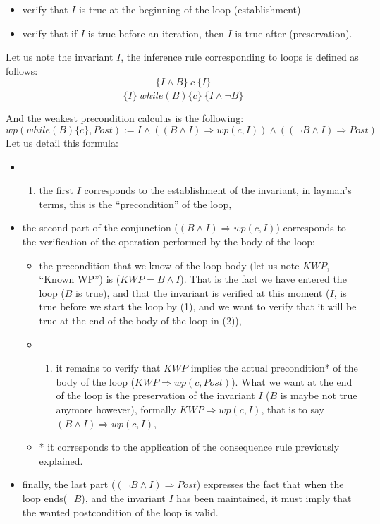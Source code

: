 \begin{itemize}
\item
  verify that $I$ is true at the beginning of the loop (establishment)
\item
  verify that if $I$ is true before an iteration, then $I$ is true
  after (preservation).
\end{itemize}


Let us note the invariant $I$, the inference rule corresponding to
loops is defined as follows:
$$\dfrac{\{I \wedge B \}\ c\ \{I\}}{\{I\}\ while(B)\{c\}\ \{I \wedge \neg B\}}$$

And the weakest precondition calculus is the following:
$$wp(while (B) \{ c \}, Post) := I \wedge ((B \wedge I) \Rightarrow wp(c, I)) \wedge ((\neg B \wedge I) \Rightarrow Post)$$
Let us detail this formula:

\begin{itemize}
\item
  \begin{enumerate}
  \def\labelenumi{(\arabic{enumi})}
  \item
    the first $I$ corresponds to the establishment of the invariant,
    in layman's terms, this is the ``precondition'' of the loop,
  \end{enumerate}
\item
  the second part of the conjunction
  ($(B \wedge I) \Rightarrow wp(c, I)$) corresponds to the
  verification of the operation performed by the body of the loop:

  \begin{itemize}
  \item
    the precondition that we know of the loop body (let us note $KWP$,
    ``Known WP'') is ($KWP = B \wedge I$). That is the fact we have
    entered the loop ($B$ is true), and that the invariant is verified
    at this moment ($I$, is true before we start the loop by (1), and
    we want to verify that it will be true at the end of the body of the
    loop in (2)),
  \item
    \begin{enumerate}
    \def\labelenumi{(\arabic{enumi})}
    \setcounter{enumi}{1}
    \item
      it remains to verify that $KWP$ implies the actual precondition*
      of the body of the loop ($KWP \Rightarrow wp(c, Post)$). What we
      want at the end of the loop is the preservation of the invariant
      $I$ ($B$ is maybe not true anymore however), formally
      $KWP \Rightarrow wp(c, I)$, that is to say
      $(B \wedge I) \Rightarrow wp(c, I)$,
    \end{enumerate}
  \item
    * it corresponds to the application of the consequence rule
    previously explained.
  \end{itemize}
\item
  finally, the last part ($(\neg B \wedge I) \Rightarrow Post$)
  expresses the fact that when the loop ends($\neg B$), and the
  invariant $I$ has been maintained, it must imply that the wanted
  postcondition of the loop is valid.
\end{itemize}

